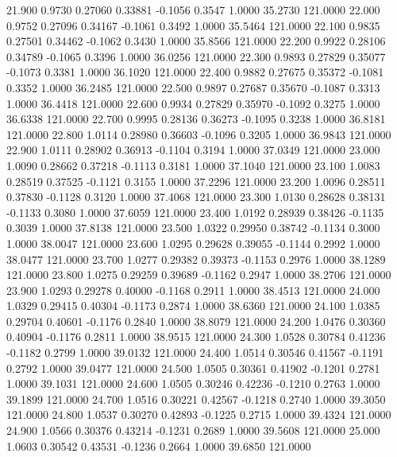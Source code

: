   21.900   0.9730   0.27060   0.33881  -0.1056   0.3547   1.0000  35.2730 121.0000
  22.000   0.9752   0.27096   0.34167  -0.1061   0.3492   1.0000  35.5464 121.0000
  22.100   0.9835   0.27501   0.34462  -0.1062   0.3430   1.0000  35.8566 121.0000
  22.200   0.9922   0.28106   0.34789  -0.1065   0.3396   1.0000  36.0256 121.0000
  22.300   0.9893   0.27829   0.35077  -0.1073   0.3381   1.0000  36.1020 121.0000
  22.400   0.9882   0.27675   0.35372  -0.1081   0.3352   1.0000  36.2485 121.0000
  22.500   0.9897   0.27687   0.35670  -0.1087   0.3313   1.0000  36.4418 121.0000
  22.600   0.9934   0.27829   0.35970  -0.1092   0.3275   1.0000  36.6338 121.0000
  22.700   0.9995   0.28136   0.36273  -0.1095   0.3238   1.0000  36.8181 121.0000
  22.800   1.0114   0.28980   0.36603  -0.1096   0.3205   1.0000  36.9843 121.0000
  22.900   1.0111   0.28902   0.36913  -0.1104   0.3194   1.0000  37.0349 121.0000
  23.000   1.0090   0.28662   0.37218  -0.1113   0.3181   1.0000  37.1040 121.0000
  23.100   1.0083   0.28519   0.37525  -0.1121   0.3155   1.0000  37.2296 121.0000
  23.200   1.0096   0.28511   0.37830  -0.1128   0.3120   1.0000  37.4068 121.0000
  23.300   1.0130   0.28628   0.38131  -0.1133   0.3080   1.0000  37.6059 121.0000
  23.400   1.0192   0.28939   0.38426  -0.1135   0.3039   1.0000  37.8138 121.0000
  23.500   1.0322   0.29950   0.38742  -0.1134   0.3000   1.0000  38.0047 121.0000
  23.600   1.0295   0.29628   0.39055  -0.1144   0.2992   1.0000  38.0477 121.0000
  23.700   1.0277   0.29382   0.39373  -0.1153   0.2976   1.0000  38.1289 121.0000
  23.800   1.0275   0.29259   0.39689  -0.1162   0.2947   1.0000  38.2706 121.0000
  23.900   1.0293   0.29278   0.40000  -0.1168   0.2911   1.0000  38.4513 121.0000
  24.000   1.0329   0.29415   0.40304  -0.1173   0.2874   1.0000  38.6360 121.0000
  24.100   1.0385   0.29704   0.40601  -0.1176   0.2840   1.0000  38.8079 121.0000
  24.200   1.0476   0.30360   0.40904  -0.1176   0.2811   1.0000  38.9515 121.0000
  24.300   1.0528   0.30784   0.41236  -0.1182   0.2799   1.0000  39.0132 121.0000
  24.400   1.0514   0.30546   0.41567  -0.1191   0.2792   1.0000  39.0477 121.0000
  24.500   1.0505   0.30361   0.41902  -0.1201   0.2781   1.0000  39.1031 121.0000
  24.600   1.0505   0.30246   0.42236  -0.1210   0.2763   1.0000  39.1899 121.0000
  24.700   1.0516   0.30221   0.42567  -0.1218   0.2740   1.0000  39.3050 121.0000
  24.800   1.0537   0.30270   0.42893  -0.1225   0.2715   1.0000  39.4324 121.0000
  24.900   1.0566   0.30376   0.43214  -0.1231   0.2689   1.0000  39.5608 121.0000
  25.000   1.0603   0.30542   0.43531  -0.1236   0.2664   1.0000  39.6850 121.0000
